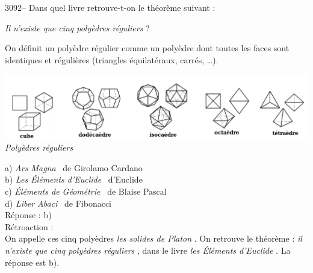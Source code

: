 \documentclass[letterpaper, 12pt]{article}
\begin{document}
3092-- Dans quel livre retrouve-t-on le th\'eor\`eme suivant :
\begin{center}
\og \emph{Il n'existe que cinq poly\`edres r\'eguliers} \fg?
\end{center}
On d\'efinit un poly\`edre r\'egulier comme un poly\`edre dont toutes les faces sont identiques et r\'eguli\`eres (triangles \'equilat\'eraux, carr\'es, \dots).
\begin{center}
\includegraphics[scale=0.5]{Polyedres_reguliers.eps}\\
\emph{Poly\`edres r\'eguliers}
\end{center}

a) \og \emph{Ars Magna} \fg \ de Girolamo Cardano\\
b) \og \emph{Les \'El\'ements d'Euclide} \fg \ d'Euclide\\
c) \og \emph{\'El\'ements de G\'eom\'etrie} \fg \ de Blaise Pascal\\
d) \og \emph{Liber Abaci} \fg \ de Fibonacci\\

R\'eponse : b)\\

R\'etroaction :\\
On appelle ces cinq poly\`edres \og \emph{les solides de Platon} \fg. On retrouve le th\'eor\`eme : \og \emph{il n'existe que cinq poly\`edres r\'eguliers} \fg, dans le livre \og \emph{les \'El\'ements d'Euclide} \fg. La r\'eponse est b).\\
\end{document}
